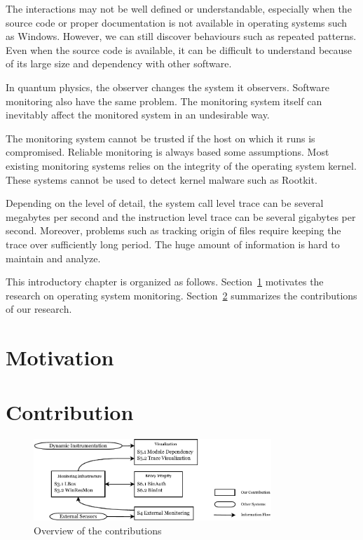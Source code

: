 \begin{tightitemize}
\item
The interactions may not be well defined or understandable,
especially when the source code or proper documentation is not available
in operating systems such as Windows.
However, we can still discover behaviours such as repeated patterns.
Even when the source code is available, it can be difficult to understand
because of its large size and dependency with other software.
\item
In quantum physics, the observer changes the system it observers.
Software monitoring also have the same problem.
The monitoring system itself can inevitably affect the monitored system
in an undesirable way.
\item
The monitoring system cannot be trusted if the host on which it
runs is compromised.
Reliable monitoring is always based some assumptions.
Most existing monitoring systems relies on the integrity of
the operating system kernel.
These systems cannot be used to detect kernel malware such as Rootkit.
\item
Depending on the level of detail, the system call level trace can be
several megabytes per second and the instruction level trace can be
several gigabytes per second.
Moreover, problems such as tracking origin of files require keeping the trace
over sufficiently long period.
The huge amount of information is hard to maintain and
analyze.
\end{tightitemize}

This introductory chapter is organized as follows.
Section~\ref{sec:motivation} motivates the research on operating system monitoring.
Section~\ref{sec:contribution} summarizes the contributions of our research.

\section{Motivation}
\label{sec:motivation}


\section{Contribution}
\label{sec:contribution}

\begin{figure}[htb]
\centering
\includegraphics[width=0.8\textwidth]{overview.pdf}
\caption{Overview of the contributions}
\label{fig:overview}
\end{figure}

